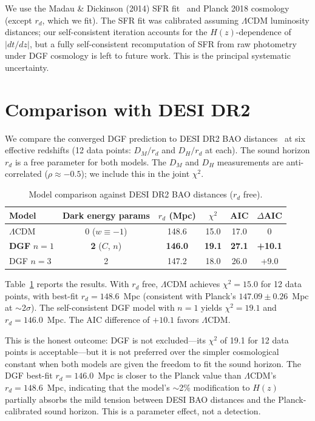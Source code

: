 \documentclass[12pt,a4paper]{article}
\begin{document}
We use the Madau \& Dickinson (2014) SFR fit~\cite{madau2014} and Planck 2018 cosmology~\cite{planck2018} (except $r_d$, which we fit). The SFR fit was calibrated assuming $\Lambda$CDM luminosity distances; our self-consistent iteration accounts for the $H(z)$-dependence of $|dt/dz|$, but a fully self-consistent recomputation of SFR from raw photometry under DGF cosmology is left to future work. This is the principal systematic uncertainty.

\section*{Comparison with DESI DR2}

We compare the converged DGF prediction to DESI DR2 BAO distances~\cite{desi2025} at six effective redshifts (12 data points: $D_M/r_d$ and $D_H/r_d$ at each). The sound horizon $r_d$ is a free parameter for both models. The $D_M$ and $D_H$ measurements are anti-correlated ($\rho\approx-0.5$); we include this in the joint $\chi^2$.

\begin{table}[htbp]
\centering
\caption{Model comparison against DESI DR2 BAO distances ($r_d$ free).}
\label{tab:models}
\begin{tabular}{lccccc}
\toprule
Model & Dark energy params & $r_d$ (Mpc) & $\chi^2$ & AIC & $\Delta$AIC \\
\midrule
$\Lambda$CDM     & 0 ($w\equiv-1$)   & 148.6 & 15.0 & 17.0 & 0 \\
{\bf DGF} $n=1$ & {\bf 2} ($C$, $n$) & {\bf 146.0} & {\bf 19.1} & {\bf 27.1} & {\bf +10.1} \\
DGF $n=3$       & 2                  & 147.2 & 18.0 & 26.0 & +9.0 \\
\bottomrule
\end{tabular}
\end{table}

Table~\ref{tab:models} reports the results. With $r_d$ free, $\Lambda$CDM achieves $\chi^2=15.0$ for 12 data points, with best-fit $r_d=148.6$~Mpc (consistent with Planck's $147.09\pm0.26$~Mpc at $\sim$2$\sigma$). The self-consistent DGF model with $n=1$ yields $\chi^2=19.1$ and $r_d=146.0$~Mpc. The AIC difference of $+10.1$ favors $\Lambda$CDM.

This is the honest outcome: DGF is not excluded---its $\chi^2$ of 19.1 for 12 data points is acceptable---but it is not preferred over the simpler cosmological constant when both models are given the freedom to fit the sound horizon. The DGF best-fit $r_d=146.0$~Mpc is closer to the Planck value than $\Lambda$CDM's $r_d=148.6$~Mpc, indicating that the model's $\sim$2\% modification to $H(z)$ partially absorbs the mild tension between DESI BAO distances and the Planck-calibrated sound horizon. This is a parameter effect, not a detection.
\end{document}
